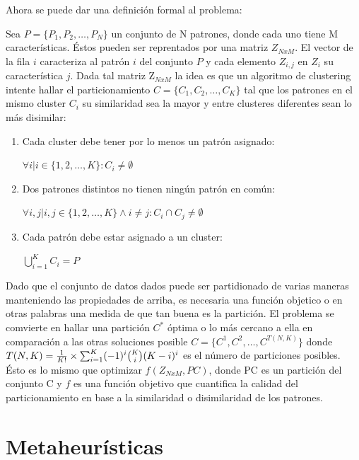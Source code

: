 Ahora se puede dar una definici\'on formal al problema:

Sea $P = \{ P_1, P_2, \dots , P_N\}$ un conjunto de N patrones, 
donde cada uno tiene M caracter\'isticas. Éstos pueden
ser reprentados por una matriz $Z_{NxM}$. El vector de la fila $i$ caracteriza al 
patr\'on $i$ del conjunto $P$ y cada elemento $Z_{i,j}$ en $Z_i$ su caracter\'istica $j$.
Dada tal matriz Z$_{NxM}$ la idea es que un algoritmo de clustering intente hallar
el particionamiento $C = \{ C_1, C_2, \dots , C_K \}$ tal que los patrones
en el mismo cluster $C_i$ su similaridad sea la mayor y entre clusteres diferentes
sean lo más disimilar:

\begin{enumerate}

\item Cada cluster debe tener por lo menos un patr\'on asignado:

$\forall i | i \in \{1, 2, \dots, K\} : C_i \neq \emptyset$

\item Dos patrones distintos no tienen ning\'un patr\'on en com\'un:

$\forall i,j | i,j\in \{1, 2, \dots, K\} \land i \neq j:  C_i \cap C_j \neq \emptyset$

\item Cada patr\'on debe estar asignado a un cluster:

$\bigcup_{i=1}^{K} C_i = P$

\end{enumerate}

Dado que el conjunto de datos dados puede ser partidionado de varias maneras
manteniendo las propiedades de arriba, es necesaria una función objetico o en otras palabras
una medida de que tan buena es la partici\'on. El problema se comvierte en hallar
una partici\'on $C^*$  \'optima o lo m\'as cercano a ella en comparaci\'on a 
las otras soluciones posible $C = \{ C^1, C^2, \dots, C^{T(N,K)} \}$ donde 
$T(N,K) = { {1 \over K!} \times {\sum_{i=1}^{K} (-1)^i  \binom{K}{i} (K-i)^i} }$
es el n\'umero de particiones posibles. \'Esto es lo mismo que optimizar $f(Z_{NxM}, PC)$,
donde PC es un partici\'on del conjunto C y $f$ es una funci\'on objetivo que
cuantifica la calidad del particionamiento en base a la similaridad o disimilaridad
de los patrones.

\section{Metaheur\'isticas}

